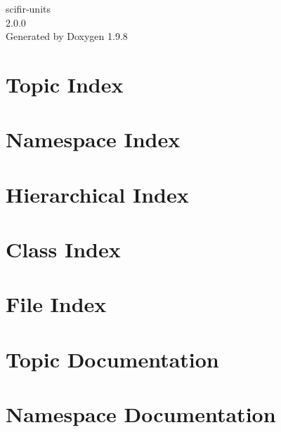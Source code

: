 \documentclass[twoside]{book}
\newcommand{\+}{\discretionary{\mbox{\scriptsize$\hookleftarrow$}}{}{}}
\newcommand{\clearemptydoublepage}{%
    \newpage{\pagestyle{empty}\cleardoublepage}%
  }
\begin{document}
  \raggedbottom
    \hypersetup{pageanchor=false,
                bookmarksnumbered=true,
                pdfencoding=unicode
               }
  \begin{titlepage}
  \vspace*{7cm}
  \begin{center}%
  {\Large scifir-\/units}\\
  [1ex]\large 2.\+0.\+0 \\
  \vspace*{1cm}
  {\large Generated by Doxygen 1.9.8}\\
  \end{center}
  \end{titlepage}
  \clearemptydoublepage
  \tableofcontents
  \clearemptydoublepage
  \hypersetup{pageanchor=true}







\chapter{Topic Index}

\chapter{Namespace Index}

\chapter{Hierarchical Index}

\chapter{Class Index}

\chapter{File Index}

\chapter{Topic Documentation}

\chapter{Namespace Documentation}

\end{document}
